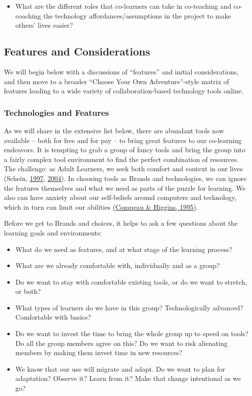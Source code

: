 \begin{itemize}
\item
  What are the different roles that co-learners can take in co-teaching
  and co-coaching the technology affordances/assumptions in the project
  to make others' lives easier?
\end{itemize}

\subsection{Features and Considerations}

We will begin below with a discussions of ``features'' and initial
considerations, and then move to a broader ``Choose Your Own
Adventure''-style matrix of features leading to a wide variety of
collaboration-based technology tools online.

\subsubsection{Technologies and Features}

As we will share in the extensive list below, there are abundant tools
now available -- both for free and for pay -- to bring great features to
our co-learning endeavors. It is tempting to grab a group of fancy tools
and bring the group into a fairly complex tool environment to find the
perfect combination of resources. The challenge: as Adult Learners, we
seek both comfort and context in our lives (Schein,
\hyperref[schein97]{1997}, \hyperref[schein04]{2004}). In choosing tools
as Brands and technologies, we can ignore the features themselves and
what we need as parts of the puzzle for learning. We also can have
anxiety about our self-beliefs around computers and technology, which in
turn can limit our abilities \hyperref[compeau]{(Compeau \& Higgins,
1995)}.

Before we get to Brands and choices, it helps to ask a few questions
about the learning goals and environments:

\begin{itemize}
\item
  What do we need as features, and at what stage of the learning
  process?
\item
  What are we already comfortable with, individually and as a group?
\item
  Do we want to stay with comfortable existing tools, or do we want to
  stretch, or both?
\item
  What types of learners do we have in this group? Technologically
  advanced? Comfortable with basics?
\item
  Do we want to invest the time to bring the whole group up to speed on
  tools? Do all the group members agree on this? Do we want to risk
  alienating members by making them invest time in new resources?
\item
  We know that our use will migrate and adapt. Do we want to plan for
  adaptation? Observe it? Learn from it? Make that change intentional as
  we go?
\end{itemize}

